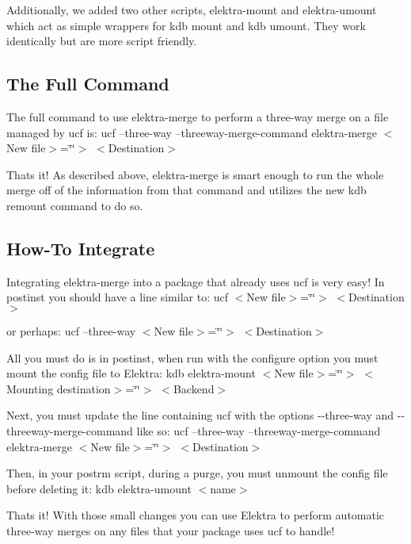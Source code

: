 Additionally, we added two other scripts, {\ttfamily elektra-\/mount} and {\ttfamily elektra-\/umount} which act as simple wrappers for {\ttfamily kdb mount} and {\ttfamily kdb umount}. They work identically but are more script friendly.

\subsection*{The Full Command}

The full command to use {\ttfamily elektra-\/merge} to perform a three-\/way merge on a file managed by ucf is\+: ucf --three-\/way --threeway-\/merge-\/command elektra-\/merge $<$\+New file$>$=\char`\"{}\char`\"{}$>$ $<$\+Destination$>$

That\textquotesingle{}s it! As described above, {\ttfamily elektra-\/merge} is smart enough to run the whole merge off of the information from that command and utilizes the new {\ttfamily kdb remount} command to do so.

\subsection*{How-\/\+To Integrate}

Integrating {\ttfamily elektra-\/merge} into a package that already uses ucf is very easy! In {\ttfamily postinst} you should have a line similar to\+: ucf $<$\+New file$>$=\char`\"{}\char`\"{}$>$ $<$\+Destination$>$

or perhaps\+: ucf --three-\/way $<$\+New file$>$=\char`\"{}\char`\"{}$>$ $<$\+Destination$>$

All you must do is in {\ttfamily postinst}, when run with the {\ttfamily configure} option you must mount the config file to Elektra\+: kdb elektra-\/mount $<$\+New file$>$=\char`\"{}\char`\"{}$>$ $<$\+Mounting destination$>$=\char`\"{}\char`\"{}$>$ $<$\+Backend$>$

Next, you must update the line containing {\ttfamily ucf} with the options {\ttfamily -\/-\/three-\/way} and {\ttfamily -\/-\/threeway-\/merge-\/command} like so\+: ucf --three-\/way --threeway-\/merge-\/command elektra-\/merge $<$\+New file$>$=\char`\"{}\char`\"{}$>$ $<$\+Destination$>$

Then, in your {\ttfamily postrm} script, during a purge, you must unmount the config file before deleting it\+: kdb elektra-\/umount $<$name$>$

That\textquotesingle{}s it! With those small changes you can use Elektra to perform automatic three-\/way merges on any files that your package uses ucf to handle!

